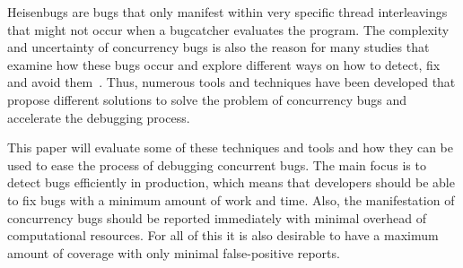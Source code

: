\documentclass[conference]{IEEEtran}
\begin{document}
Heisenbugs are bugs that only manifest within very specific thread interleavings that might not occur when a bugcatcher evaluates the program.
The complexity and uncertainty of concurrency bugs is also the reason for many studies that examine how these bugs occur and explore different ways on how to detect, fix and avoid them~\cite{tu2019go}.
Thus, numerous tools and techniques have been developed that propose different solutions to solve the problem of concurrency bugs and accelerate the debugging process.

This paper will evaluate some of these techniques and tools and how they can be used to ease the process of debugging concurrent bugs.
The main focus is to detect bugs efficiently in production, which means that developers should be able to fix bugs with a minimum amount of work and time.
Also, the manifestation of concurrency bugs should be reported immediately with minimal overhead of computational resources.
For all of this it is also desirable to have a maximum amount of coverage with only minimal false-positive reports.
\end{document}
